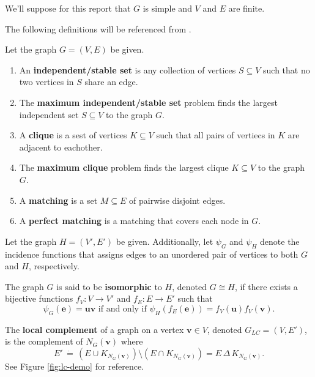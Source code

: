 \documentclass[12pt]{report} %
\begin{document}
We'll suppose for this report that $G$ is simple and $V$ and $E$ are finite. 

\newpage 

The following definitions will be referenced from \cite{Adcock_2020, conforti2014integer, diestel2017graph, hicks2006branch}.

\begin{tcolorbox}[colback=orange!10!white, colframe=orange!75!black, title=\textbf{Definition}]
    Let the graph $G = (V,E)$ be given. 
    \begin{enumerate}[label=(\roman*), font=\itshape]
        \item An \textbf{independent/stable set} is any collection of vertices $S \subseteq V$ such that no two vertices in $S$ share an edge. 
        \item The \textbf{maximum independent/stable set} problem finds the largest independent set $S \subseteq V$ to the graph $G$.
        \item A \textbf{clique} is a sest of vertices $K \subseteq V$ such that all pairs of vertiecs in $K$ are adjacent to eachother.  
        \item The \textbf{maximum clique} problem finds the largest clique $K \subseteq V$ to the graph $G$. 
        \item A \textbf{matching} is a set $M \subseteq E$ of pairwise disjoint edges. 
        \item A \textbf{perfect matching} is a matching that covers each node in $G$. 
    \end{enumerate}
    
    Let the graph $H = (V',E')$ be given. Additionally, let $\psi_G$ and $\psi_H$ denote the incidence functions that assigns edges to an unordered pair of vertices to both $G$ and $H$, respectively. 
    
    \vspace{1em}
    
    The graph $G$ is said to be \textbf{isomorphic} to $H$, denoted $G \cong H$, if there exists a bijective functions $f_{V}: V \to V'$ and $f_{E}: E \to E'$ such that  
    \begin{equation*}
        \psi_G(\mathbf{e}) = \mathbf{u}\mathbf{v} \text{ if and only if } \psi_{H}(f_{E}(\mathbf{e})) = f_{V}(\mathbf{u})f_{V}(\mathbf{v}).
    \end{equation*}

    The \textbf{local complement} of a graph on a vertex $\mathbf{v} \in V$, denoted $G_{LC} = (V, E')$, 
    is the complement of $N_{G}(\mathbf{v})$ where  
    \begin{equation*}
        E' \, \dot{=} \, (E \cup K_{N_{G}(\mathbf{v})}) \setminus (E \cap K_{N_{G}(\mathbf{v})}) = E \, \Delta \, K_{N_{G}(\mathbf{v})}.
    \end{equation*}
    See Figure \ref{fig:lc-demo} for reference.
\end{tcolorbox}
\end{document}
